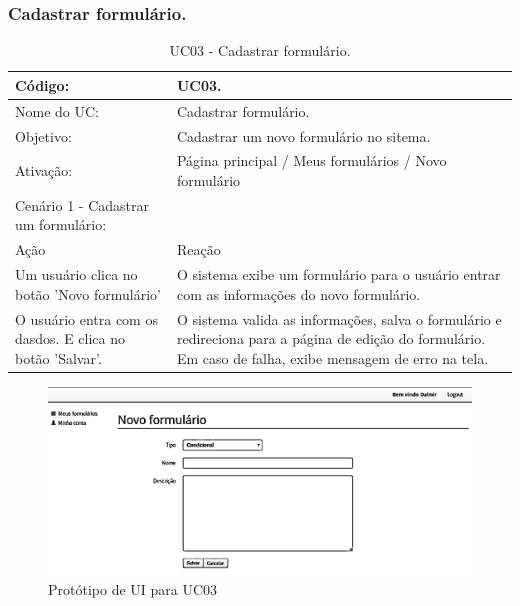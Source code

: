 \documentclass[11pt]{article}
\begin{document}
    \clearpage

      \subsubsection{Cadastrar formulário.}

        \begin{table}[h]
          \begin{center}
            \begin{tabular}{ | p{7cm} | p{8cm} | }
              \hline
              Código: \cellcolor{gray} & UC03. \\
              \hline
              Nome do UC: \cellcolor{gray} & Cadastrar formulário. \\
              \hline
              Objetivo: \cellcolor{gray} & Cadastrar um novo formulário no sitema. \\
              \hline
              Ativação: \cellcolor{gray} & Página principal / Meus formulários / Novo formulário \\
              \hline
              \hline
              Cenário 1 - Cadastrar um formulário: &  \\
              \hline
              Ação\cellcolor{gray} & Reação\cellcolor{gray} \\
              \hline
              Um usuário clica no botão 'Novo formulário' & O sistema exibe um formulário para o usuário entrar com as informações do novo formulário. \\
              \hline
              O usuário entra com os dasdos. E clica no botão 'Salvar'. & O sistema valida as informações, salva o formulário e redireciona para a página de edição do formulário. Em caso de falha, exibe mensagem de erro na tela. \\
              \hline
            \end{tabular}
            \caption{UC03 - Cadastrar formulário.}
          \end{center}
        \end{table}
        
        \begin{figure}[h!]
          \centering
          \includegraphics[width=.9\textwidth]{new_form.png}
          \caption{Protótipo de UI para UC03}
        \end{figure}
\end{document}
